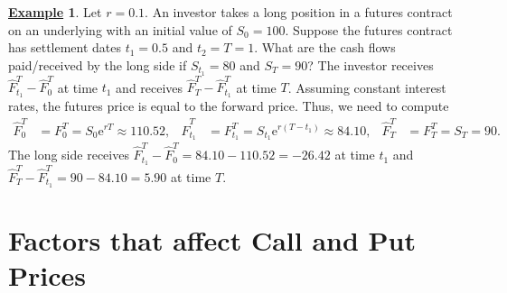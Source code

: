 \documentclass[12pt]{book}
\numberwithin{equation}{chapter}
\theoremstyle{plain}
\numberwithin{theorem}{section}
\theoremstyle{definition}
\newtheorem{example}[theorem]{\underline{Example}}
\numberwithin{exercise}{chapter}
\newcommand{\<}{\langle}
\renewcommand{\>}{\rangle}
\renewcommand{\(}{\left(}
\renewcommand{\)}{\right)}
\renewcommand{\[}{\left[}
\renewcommand{\]}{\right]}
\newcommand\Fh{\widehat{F}}
\newcommand\ee{\mathrm{e}}
\theoremstyle{definition}
\numberwithin{question}{section}
\begin{document}
\begin{example}
Let $r=0.1$.  An investor takes a long position in a futures contract on an underlying with an initial value of $S_0 = 100$.  Suppose the futures contract has settlement dates $t_1 = 0.5$ and $t_2 = T = 1$.  What are the cash flows paid/received by the long side if $S_{t_1} = 80$ and $S_T = 90$?  The investor receives $\Fh_{t_1}^T - \Fh_0^T$ at time $t_1$ and receives $\Fh_T^T - \Fh_{t_1}^T$ at time $T$.  Assuming constant interest rates, the futures price is equal to the forward price.  Thus, we need to compute
\begin{align}
\Fh_0^T 
	&=	F_0^T = S_0 \ee^{r T} \approx 110.52, &
\Fh_{t_1}^T
	&=	F _{t_1}^T = S_{t_1} \ee^{r (T - t_1)} \approx 84.10, &
\Fh_T^T
	&=	F_T^T = S_T = 90 .
\end{align}
The long side receives $\Fh_{t_1}^T - \Fh_0^T = 84.10-110.52 = -26.42$ at time $t_1$ and $\Fh_T^T - \Fh_{t_1}^T = 90 - 84.10=5.90$ at time $T$.
\end{example}


\section{Factors that affect Call and Put Prices}
\end{document}
